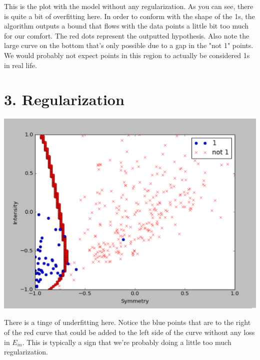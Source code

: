 \documentclass[12pt]{article}
\begin{document}
This is the plot with the model without any regularization. As you can see, there is quite a bit of overfitting here. In order to conform with the shape of the 1s, the algorithm outputs a bound that flows with the data points a little bit too much for our comfort. The red dots represent the outputted hypothesis. Also note the large curve on the bottom that's only possible due to a gap in the "not 1" points. We would probably not expect points in this region to actually be considered 1s in real life.

\section*{3. Regularization}
\includegraphics[scale=.5]{3-1.png}

There is a tinge of underfitting here. Notice the blue points that are to the right of the red curve that could be added to the left side of the curve without any loss in $E_{in}$. This is typically a sign that we're probably doing a little too much regularization.
\end{document}

